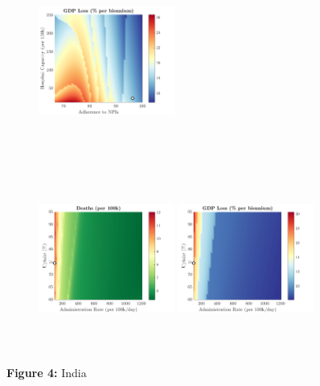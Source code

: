\documentclass[paper=a4, fontsize=11pt]{scrartcl}
\numberwithin{figure}{section}
\numberwithin{table}{section}
\begin{document}
\begin{figure}[H]
\begin{subfigure}[b]{\textwidth}
	\hspace{0.05cm}
    	\includegraphics[width=0.49\textwidth,height=6cm]{IN/SARS/npl_g}
    \end{subfigure}
    \begin{subfigure}[b]{\textwidth}
      	\includegraphics[width=0.49\textwidth,height=6cm]{IN/SARS/imm_d}
	\hspace{0.05cm}
    	\includegraphics[width=0.49\textwidth,height=6cm]{IN/SARS/imm_g}
    \end{subfigure}
\caption*{\textbf{Figure 4:} India} 
\end{figure}
\end{document}
